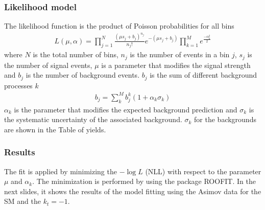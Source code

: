 \documentclass[11pt]{beamer}
\begin{document}
\begin{frame}
\frametitle{Likelihood model}
The likelihood function is the product of Poisson probabilities for all bins
\begin{align}
	L(\mu,\alpha)=\prod_{j=1}^{N}\frac{(\mu s_j +b_j)^{n_j}}{n_j !}e^{-(\mu s_j+b_j)} \prod_{k=1}^M e^{\frac{-\alpha^2_k}{2}}
\end{align}
	where $N$ is the total number of bins, $n_j$ is the number of events in a bin $j$, $s_j$ is the number of signal events, $\mu$ is a parameter that modifies the signal strength and $b_j$ is the number of background events.
	$b_j$ is the sum of different background processes $k$
\begin{align}
b_j=\sum_k^M b_j^k(1+ \alpha_k \sigma_k)
\end{align}
$\alpha_k$ is the parameter that modifies the expected background prediction and $\sigma_k$ is the systematic uncertainty of the associated background. $\sigma_k$ for the backgrounds are shown in the Table of yields.
\end{frame}


\begin{frame}
\frametitle{Results}
	The fit is applied by minimizing the $-\log{L}$ (NLL) with respect to the parameter $\mu$ and $\alpha_k$. The minimization is performed by using the package ROOFIT. In the next slides, it shows the results of the model fitting using the Asimov data for the SM and the $k_t=-1$.
\end{frame}
\end{document}
